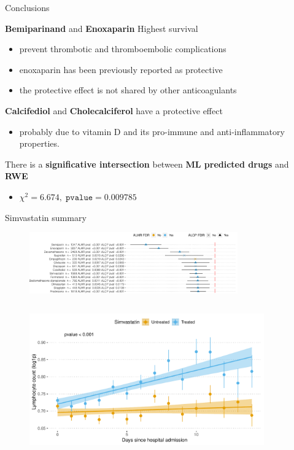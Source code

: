 \documentclass[compress,ignorenonframetext,aspectratio=1610,handout]{beamer}
\begin{document}
\begin{frame}{Conclusions}

	\textbf{Bemiparinand} and \textbf{Enoxaparin} \textrightarrow Highest survival
	\begin{itemize}
		\item prevent thrombotic and thromboembolic complications
		\item enoxaparin has been previously reported as protective
		\item the protective effect is not shared by other anticoagulants
	\end{itemize}

	\textbf{Calcifediol} and \textbf{Cholecalciferol} have a protective effect
	\begin{itemize}
		\item probably due to vitamin D and its pro-immune and anti-inflammatory properties.
	\end{itemize}

	There is a \textbf{significative intersection} between \textbf{ML predicted drugs} and \textbf{RWE}
	\begin{itemize}
		\item $\chi^{2} = 6.674, \; \mathtt{pvalue} = 0.009785$
	\end{itemize}

\end{frame}

\begin{frame}{Simvastatin summary}

	\begin{figure}
		\includegraphics[width=0.8\textwidth]{figs/results/simvastatin_summary_.png}	
	\end{figure}
		
	\begin{columns}
			
		\begin{figure}
			\includegraphics[width=0.9\textwidth]{figs/results/db00641_simvastatin_lymphocite_progression.pdf}	
		\end{figure}

	\end{columns}

\end{frame}
\end{document}
